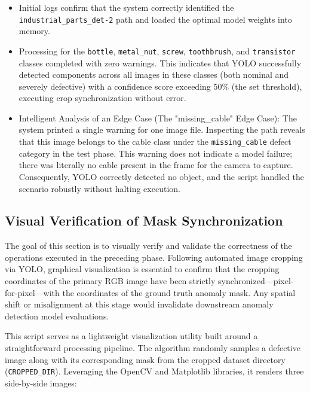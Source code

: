 \documentclass{article}
\begin{document}
\begin{itemize}
	\item Initial logs confirm that the system correctly identified the \texttt{industrial\_parts\_det-2} path and loaded the optimal model weights into memory.
	
	\item Processing for the \texttt{bottle}, \texttt{metal\_nut}, \texttt{screw}, \texttt{toothbrush}, and \texttt{transistor} classes completed with zero warnings. This indicates that YOLO successfully detected components across all images in these classes (both nominal and severely defective) with a confidence score exceeding 50\% (the set threshold), executing crop synchronization without error.
	
	\item Intelligent Analysis of an Edge Case (The "missing\_cable" Edge Case): The system printed a single warning for one image file. Inspecting the path reveals that this image belongs to the cable class under the \texttt{missing\_cable} defect category in the test phase. This warning does not indicate a model failure; there was literally no cable present in the frame for the camera to capture. Consequently, YOLO correctly detected no object, and the script handled the scenario robustly without halting execution.
\end{itemize}


\subsection{Visual Verification of Mask Synchronization}

The goal of this section is to visually verify and validate the correctness of the operations executed in the preceding phase. Following automated image cropping via YOLO, graphical visualization is essential to confirm that the cropping coordinates of the primary RGB image have been strictly synchronized—pixel-for-pixel—with the coordinates of the ground truth anomaly mask. Any spatial shift or misalignment at this stage would invalidate downstream anomaly detection model evaluations.

This script serves as a lightweight visualization utility built around a straightforward processing pipeline. The algorithm randomly samples a defective image along with its corresponding mask from the cropped dataset directory (\texttt{CROPPED\_DIR}). Leveraging the OpenCV and Matplotlib libraries, it renders three side-by-side images:
\end{document}
